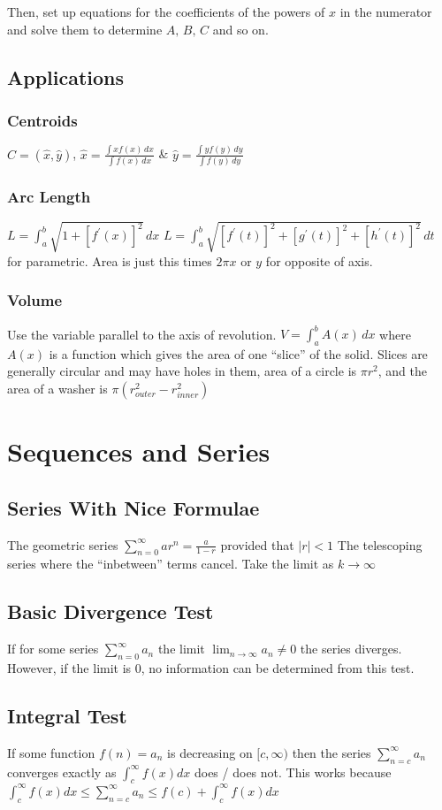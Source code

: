 \documentclass[10pt,landscape,letterpaper]{cheatsheet}
\begin{document}
Then, set up equations for the coefficients of the powers of $x$ in the numerator and solve them to determine $A,\,B,\,C$ and so on.
\subsection*{Applications}
\subsubsection*{Centroids}
$C = (\hat{x}, \hat{y})$,
$\hat{x} = \frac{\int xf(x) \,dx}{\int f(x) \,dx}$ \&
$\hat{y} = \frac{\int yf(y) \,dy}{\int f(y) \,dy}$
\subsubsection*{Arc Length}
$L = \int_{a}^{b} \sqrt{1+[f^{\prime}(x)]^2} \,dx$
$L = \int_{a}^{b} \sqrt{[f^{\prime}(t)]^2+[g^{\prime}(t)]^2+[h^{\prime}(t)]^2} \,dt$ for parametric. Area is just this times $2\pi x$ or $y$ for opposite of axis.
\subsubsection*{Volume} Use the variable parallel to the axis of revolution.
$V = \int_{a}^{b} A(x) \,dx$ where $A(x)$ is a function which gives the area
of one ``slice'' of the solid. Slices are generally circular and may have holes in them, area
of a circle is $\pi r^2$, and the area of a washer is $\pi (r_{outer}^2-r_{inner}^2)$

\section*{Sequences and Series}
\subsection*{Series With Nice Formulae}
The geometric series $\sum_{n=0}^{\infty}ar^n=\frac{a}{1-r}$ provided that $|r|<1$
The telescoping series where the ``inbetween'' terms cancel. Take the limit as $k\to\infty$
\subsection{Basic Divergence Test}
If for some series $\sum_{n=0}^{\infty}a_n$ the limit $\lim_{n \to \infty} a_n \neq 0$ the series diverges.
However, if the limit is 0, no information can be determined from this test.
\subsection*{Integral Test}
If some function $f(n)=a_n$ is decreasing on $[c,\infty)$ then the
series $\sum_{n=c}^{\infty}a_n$ converges exactly as $\int_{c}^{\infty}f(x)dx$ does / does not. This works because
$\int_{c}^{\infty}f(x)dx\leq\sum_{n=c}^{\infty}a_n\leq f(c)+\int_{c}^{\infty}f(x)dx$
\end{document}
